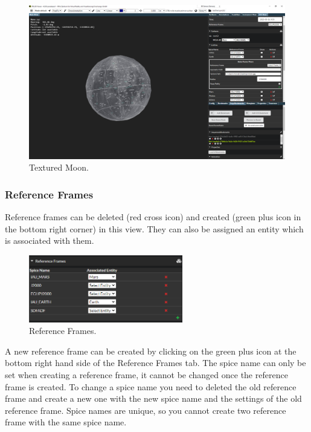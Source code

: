 \begin{figure}[h!]
	\centering
	\includegraphics[width=1\textwidth]{pics/exampleMoonTexture.png}
	\caption{Textured Moon.}
\end{figure}



\hypertarget{reference-frames}{%
	\subsubsection{Reference Frames}\label{reference-frames}}

Reference frames can be deleted (red cross icon) and created (green plus
icon in the bottom right corner) in this view. They can also be assigned
an entity which is associated with them.

\begin{figure}[h!]
	\centering
	\includegraphics[width=0.6\textwidth]{pics/referenceFrames.png}
	\caption{Reference Frames.}
\end{figure}

A new reference frame can be created by clicking on the green plus icon
at the bottom right hand side of the Reference Frames tab. The spice
name can only be set when creating a reference frame, it cannot be
changed once the reference frame is created. To change a spice name you
need to deleted the old reference frame and create a new one with the
new spice name and the settings of the old reference frame. Spice names
are unique, so you cannot create two reference frame with the same spice
name.

